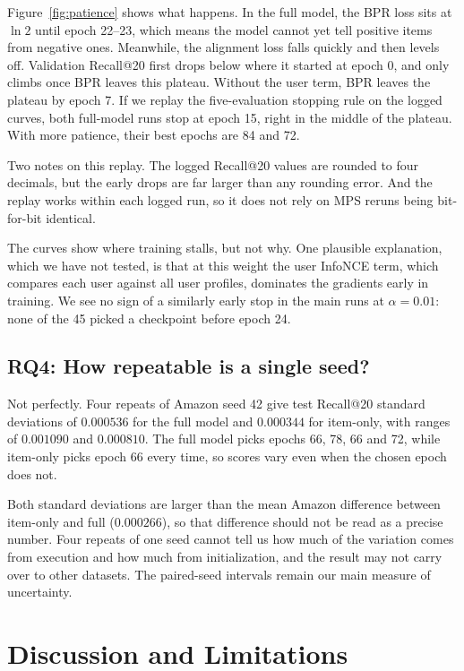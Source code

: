 \documentclass[runningheads]{llncs}
\begin{document}
Figure~\ref{fig:patience} shows what happens. In the full model, the BPR loss
sits at $\ln 2$ until epoch 22--23, which means the model cannot yet tell
positive items from negative ones. Meanwhile, the alignment loss falls
quickly and then levels off. Validation Recall@20 first drops below where it started at epoch 0,
and only climbs once BPR leaves this plateau. Without the user term, BPR
leaves the plateau by epoch 7. If we replay the five-evaluation stopping rule
on the logged curves, both full-model runs stop at epoch 15, right in the
middle of the plateau. With more patience, their best epochs are 84 and 72.

Two notes on this replay. The logged Recall@20 values are rounded to four
decimals, but the early drops are far larger than any rounding error. And the
replay works within each logged run, so it does not rely on MPS reruns being
bit-for-bit identical.

The curves show where training stalls, but not why. One plausible
explanation, which we have not tested, is that at this weight the user InfoNCE
term, which compares each user against all user profiles, dominates the
gradients early in training. We see no sign of a similarly early stop in the
main runs at $\alpha=0.01$: none of the 45 picked a checkpoint before epoch 24.

\subsection{RQ4: How repeatable is a single seed?}
\label{sec:resolution}
Not perfectly. Four repeats of Amazon seed 42 give test Recall@20 standard
deviations of $0.000536$ for the full model and $0.000344$ for item-only, with
ranges of $0.001090$ and $0.000810$. The full model picks epochs 66, 78, 66
and 72, while item-only picks epoch 66 every time, so scores vary even when
the chosen epoch does not.

Both standard deviations are larger than the mean Amazon difference between
item-only and full ($0.000266$), so that difference should not be read as a
precise number. Four repeats of one seed cannot tell us how much of the
variation comes from execution and how much from initialization, and the
result may not carry over to other datasets. The paired-seed intervals remain
our main measure of uncertainty.

\section{Discussion and Limitations}
\end{document}
